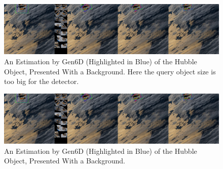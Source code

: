 \begin{figure}[ht]
  \centering
  \includegraphics[width=\textwidth]{data/res1.jpg}
  \caption{An Estimation by Gen6D (Highlighted in Blue) of the Hubble Object, Presented With a Background. Here the query object size is too big for the detector.}
  \label{fig:cap4}
\end{figure}

\begin{figure}[ht]
  \centering
  \includegraphics[width=\textwidth]{data/res1.jpg}
  \caption{An Estimation by Gen6D (Highlighted in Blue) of the Hubble Object, Presented With a Background.}
  \label{fig:cap2}
\end{figure}



